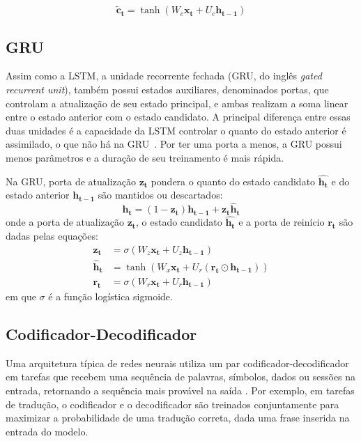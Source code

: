 \begin{equation}
    \mathbf{\tilde{c}_t} = \tanh(W_c\mathbf{x_t} + U_c\mathbf{h_{t-1}})
\end{equation}


\subsection{GRU}
Assim como a LSTM, a unidade recorrente fechada (GRU, do inglês \textit{gated
recurrent unit}), também possui estados auxiliares, denominados portas, que
controlam a atualização de seu estado principal, e ambas realizam a soma linear
entre o estado anterior com o estado candidato. A principal diferença entre
essas duas unidades é a capacidade da LSTM controlar o quanto do estado anterior
é assimilado, o que não há na GRU~\cite{chung2014empirical}. Por ter uma porta a menos, a GRU possui menos parâmetros e a duração de seu treinamento é mais rápida.

Na GRU, porta de atualização $\mathbf{z_t}$ pondera o quanto do
estado candidato $\mathbf{\hat{h_t}}$ e do estado anterior $\mathbf{h_{t-1}}$
são mantidos ou descartados:
\begin{equation}
    \mathbf{h_t} = (1 - \mathbf{z_t})\mathbf{h_{t-1}} + \mathbf{z_t}\mathbf{\hat{h}_t}
\end{equation}
onde a porta de atualização $\mathbf{z_t}$, o estado candidato $\mathbf{\hat{h_t}}$
e a porta de reinício $\mathbf{r_t}$ são dadas pelas equações:
\begin{align}
    \mathbf{z_t} &= \sigma(W_z\mathbf{x_t} + U_z\mathbf{h_{t-1}}) \\
    \mathbf{\hat{h}_t} &= \tanh(W_x\mathbf{x_t} + U_r(\mathbf{r_t} \odot \mathbf{h_{t-1}})) \\
    \mathbf{r_t} &= \sigma(W_r\mathbf{x_t} + U_r\mathbf{h_{t-1}})
\end{align}
em que $\sigma$ é a função logística sigmoide.

\subsection{Codificador-Decodificador}
Uma arquitetura típica de redes neurais utiliza um par codificador-decodificador
em tarefas que recebem uma sequência de palavras, símbolos, dados ou sessões na
entrada, retornando a sequência mais provável na saída
\cite{bahdanau2016neural}. Por exemplo, em tarefas de tradução, o codificador e
o decodificador são treinados conjuntamente para maximizar a probabilidade de
uma tradução correta, dada uma frase inserida na entrada do modelo.

